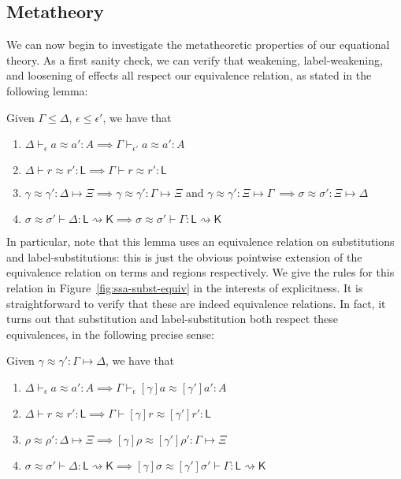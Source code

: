 \documentclass[acmsmall,screen,review]{acmart}
\newcounter{todos}
\newcommand{\todo}[1]{\stepcounter{todos} \textcolor{red}{TODO \arabic{todos}: #1}}
\newcommand{\ms}[1]{\ensuremath{\mathsf{#1}}}
\newcommand{\issubst}[3]{#1: #2 \mapsto #3}
\newcommand{\lbsubst}[4]{#1 \vdash #2: #3 \rightsquigarrow #4}
\newcommand{\teqv}{\approx}
\newcommand{\tmeq}[5]{#1 \vdash_{#2} #3 \teqv #4 : {#5}}
\newcommand{\lbeq}[4]{#1 \vdash #2 \teqv #3 : {#4}}
\newcommand{\tmseq}[4]{\issubst{#1 \teqv #2}{#3}{#4}}
\newcommand{\lbseq}[5]{\lbsubst{#1 \teqv #2}{#3}{#4}{#5}}
\begin{document}
\subsection{Metatheory}

We can now begin to investigate the metatheoretic properties of our equational theory. As a first
sanity check, we can verify that weakening, label-weakening, and loosening of effects all respect
our equivalence relation, as stated in the following lemma:
\begin{lemma}
  Given $\Gamma \leq \Delta$, $\epsilon \leq \epsilon'$, we have that
  \begin{enumerate}[label=(\alph*)]
    \item $\tmeq{\Delta}{\epsilon}{a}{a'}{A} \implies \tmeq{\Gamma}{\epsilon'}{a}{a'}{A}$
    \item $\lbeq{\Delta}{r}{r'}{\ms{L}} \implies \lbeq{\Gamma}{r}{r'}{\ms{L}}$
    \item $\tmseq{\gamma}{\gamma'}{\Delta}{\Xi} 
      \implies \tmseq{\gamma}{\gamma'}{\Gamma}{\Xi}$ and
      $\tmseq{\gamma}{\gamma'}{\Xi}{\Gamma}\
      \implies \tmseq{\sigma}{\sigma'}{\Xi}{\Delta}$
    \item $\lbseq{\sigma}{\sigma'}{\Delta}{\ms{L}}{\ms{K}}
      \implies \lbseq{\sigma}{\sigma'}{\Gamma}{\ms{L}}{\ms{K}}$
  \end{enumerate}
\end{lemma}
In particular, note that this lemma uses an equivalence relation on substitutions and
label-substitutions: this is just the obvious pointwise extension of the equivalence relation on
terms and regions respectively. We give the rules for this relation in
Figure~\ref{fig:ssa-subst-equiv} in the interests of explicitness. It is straightforward to verify
that these are indeed equivalence relations.  In fact, it turns out that substitution and
label-substitution both respect these equivalences, in the following precise sense:
\begin{lemma}
  Given $\tmseq{\gamma}{\gamma'}{\Gamma}{\Delta}$, we have that
  \begin{enumerate}[label=(\alph*)]
    \item $\tmeq{\Delta}{\epsilon}{a}{a'}{A} 
      \implies \tmeq{\Gamma}{\epsilon}{[\gamma]a}{[\gamma']a'}{A}$
    \item $\lbeq{\Delta}{r}{r'}{\ms{L}} 
      \implies \lbeq{\Gamma}{[\gamma]r}{[\gamma']r'}{\ms{L}}$
    \item $\tmseq{\rho}{\rho'}{\Delta}{\Xi}
      \implies \tmseq{[\gamma]\rho}{[\gamma']\rho'}{\Gamma}{\Xi}$
    \item $\lbseq{\sigma}{\sigma'}{\Delta}{\ms{L}}{\ms{K}}
      \implies \lbseq{[\gamma]\sigma}{[\gamma']\sigma'}{\Gamma}{\ms{L}}{\ms{K}}$
  \end{enumerate}
\end{lemma}
\end{document}
